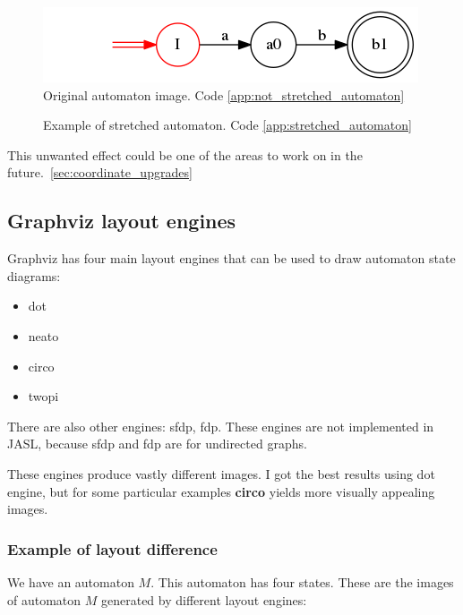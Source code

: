 \documentclass{ctuthesis}
\begin{document}
\begin{figure}[H]
\includegraphics[width=0.5\linewidth]{figures/not_stretched.png}
\caption{Original automaton image. Code \ref{app:not_stretched_automaton}}
\label{fig:not_stretched_automaton}
\end{figure}

\begin{figure}[H]
\caption{Example of stretched automaton. Code \ref{app:stretched_automaton}}
\label{fig:stretched_automaton}
\end{figure}

This unwanted effect could be one of the areas to work on in the future.~\ref{sec:coordinate_upgrades}

\subsection{Graphviz layout engines}
Graphviz has four main layout engines that can be used to draw automaton state diagrams:
\begin{itemize}
	\item dot
	\item neato
	\item circo
	\item twopi
\end{itemize}

There are also other engines: sfdp, fdp. These engines are not implemented in JASL, because sfdp and fdp are for undirected graphs.

These engines produce vastly different images. I got the best results using dot engine, but for some particular examples \textbf{circo} yields more visually appealing images.

\subsubsection{Example of layout difference}
We have an automaton $M$. This automaton has four states. These are the images of automaton $M$ generated by different layout engines:
\end{document}
